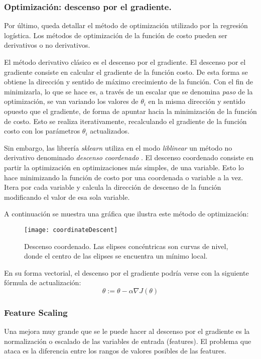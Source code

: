 \subsubsection{Optimización: descenso por el gradiente.}
Por último, queda detallar el método de optimización utilizado por la regresión logística. Los métodos de optimización de la función de costo pueden ser derivativos o no derivativos.

El método derivativo clásico es el descenso por el gradiente. El descenso por el gradiente consiste en calcular el gradiente de la función costo. De esta forma se obtiene la dirección y sentido de máximo crecimiento de la función. Con el fin de minimizarla, lo que se hace es, a través de un escalar que se denomina \textit{paso} de la optimización, se van variando los valores de $\theta_{i}$ en la misma dirección y sentido opuesto que el gradiente, de forma de apuntar hacia la minimización de la función de costo. Esto se realiza iterativamente, recalculando el gradiente de la función costo con los parámetros $\theta_{i}$ actualizados.

Sin embargo, las librería \textit{sklearn} utiliza en el modo \textit{liblinear} un método no derivativo denominado \textit{descenso coordenado} \cite{sklearnLinearModel}. El descenso coordenado consiste en partir la optimización en optimizaciones más simples, de una variable. Esto lo hace minimizando la función de costo por una coordenada o variable a la vez. Itera por cada variable y calcula la dirección de descenso de la función modificando el valor de esa sola variable.

A continuación se muestra una gráfica que ilustra este método de optimización:

\begin{figure}[H]
\centering
\texttt{[image: coordinateDescent]}
\caption{Descenso coordenado. Las elipses concéntricas son curvas de nivel, donde el centro de las elipses se encuentra un mínimo local. \cite{wikipediaCoordinateDescent}}
\label{fig:coordinateDescent}
\end{figure}

En su forma vectorial, el descenso por el gradiente podría verse con la siguiente fórmula de actualización:
\begin{equation} \label{eq:gdesc}
\theta := \theta - \alpha \nabla J(\theta)
\end{equation}

\subsubsection{Feature Scaling}
Una mejora muy grande que se le puede hacer al descenso por el gradiente es la normalización o escalado de las variables de entrada (features). El problema que ataca es la diferencia entre los rangos de valores posibles de las features. 

